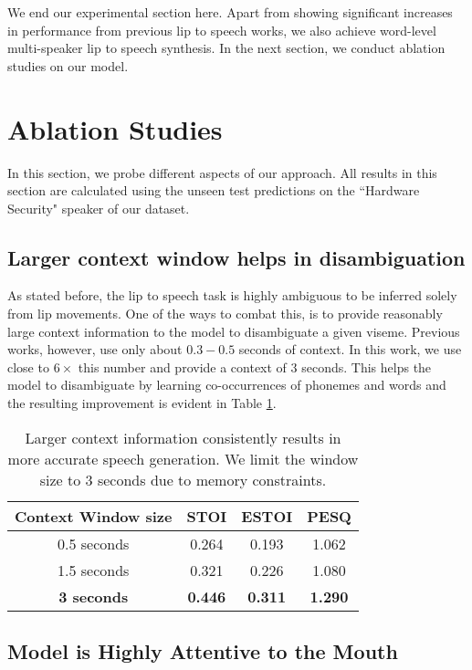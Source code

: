 \documentclass[10pt,twocolumn,letterpaper]{article}
\begin{document}
We end our experimental section here. Apart from showing significant increases in performance from previous lip to speech works, we also achieve word-level multi-speaker lip to speech synthesis. In the next section, we conduct ablation studies on our model.
\section{Ablation Studies}
\label{section:ablation}
In this section, we probe different aspects of our \modelname approach. All results in this section are calculated using the unseen test predictions on the ``Hardware Security" speaker of our \modelname dataset. 

\subsection{Larger context window helps in disambiguation}
\label{subsection:contextwindow}
As stated before, the lip to speech task is highly ambiguous to be inferred solely from lip movements. One of the ways to combat this, is to provide reasonably large context information to the model to disambiguate a given viseme. Previous works, however, use only about $0.3 - 0.5$ seconds of context. In this work, we use close to $6\times$ this number and provide a context of $3$ seconds. This helps the model to disambiguate by learning co-occurrences of phonemes and words and the resulting improvement is evident in Table \ref{tab:contextwindows}. 
\begin{table}[h]
\centering
  \begin{tabular}{|c||c|c|c|}
    \hline
    Context Window size & STOI & ESTOI & PESQ \\
    \hline
    0.5 seconds & 0.264 & 0.193 & 1.062\\
    1.5 seconds & 0.321 & 0.226 & 1.080\\
    \textbf{3 seconds} &\textbf{0.446} & \textbf{0.311} & \textbf{1.290}\\
  \hline
\end{tabular}
    \vspace{.2cm}
    \caption{Larger context information consistently results in more accurate speech generation. We limit the window size to $3$ seconds due to memory constraints.}
    \label{tab:contextwindows}
\end{table}

\subsection{Model is Highly Attentive to the Mouth}
\end{document}
